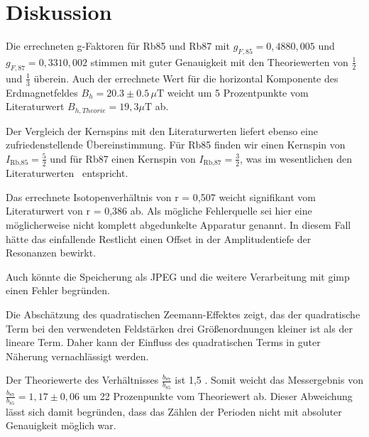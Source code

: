 \section{Diskussion}
Die errechneten g-Faktoren für Rb85 und Rb87 mit $g_{F,85} = 0,488 $\pm$ 0,005$ und
$g_{F,87} = 0,331 $\pm$ 0,002$ stimmen mit guter Genauigkeit mit den Theoriewerten von $\frac{1}{2}$ und $\frac{1}{3}$ überein.
Auch der errechnete Wert für die horizontal Komponente des Erdmagnetfeldes $B_{h} = 20.3\pm0.5\,\mu\text{T}$ weicht um 5 Prozentpunkte vom
Literaturwert $B_{h,Theorie} = 19,3\mu\text{T}$ \cite{hB} ab.

Der Vergleich der Kernspins mit den Literaturwerten liefert ebenso eine zufriedenstellende Übereinstimmung.
Für Rb85 finden wir einen Kernspin von  $I_\text{Rb,85} = \frac{5}{2}$ und für Rb87 einen Kernspin von $I_\text{Rb,87} = \frac{3}{2}$, was im wesentlichen den Literaturwerten \cite{coreSpin} entspricht.

Das errechnete Isotopenverhältnis von r = 0,507 weicht signifikant vom Literaturwert von r = 0,386 \cite{isoVer} ab. Als mögliche Fehlerquelle
sei hier eine möglicherweise nicht komplett abgedunkelte Apparatur genannt. In diesem Fall hätte das einfallende Restlicht
einen Offset in der Amplitudentiefe der Resonanzen bewirkt.

Auch könnte die Speicherung als JPEG und die weitere Verarbeitung mit gimp einen Fehler begründen.

Die Abschätzung des quadratischen Zeemann-Effektes zeigt, das der quadratische Term bei den verwendeten Feldstärken drei Größenordnungen kleiner ist als der lineare Term. Daher kann der Einfluss des quadratischen Terms in guter Näherung vernachlässigt werden.

Der Theoriewerte des Verhältnisses $\frac{b_{87}}{b_{85}}$ ist 1,5 \cite{FP}. Somit weicht das Messergebnis von $\frac{b_{87}}{b_{85}} = 1,17 \pm 0,06$ um 22 Prozenpunkte vom Theoriewert ab.
Dieser Abweichung lässt sich damit begründen, dass das Zählen der Perioden nicht mit absoluter Genauigkeit möglich war.

\printbibliography
